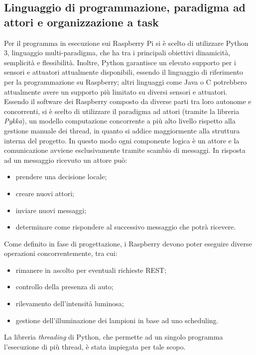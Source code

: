 \subsection{Linguaggio di programmazione, paradigma ad attori e organizzazione a task}
Per il programma in esecuzione sui Raspberry Pi si è scelto di utilizzare Python 3, linguaggio multi-paradigma, che ha tra i principali obiettivi dinamicità, semplicità e flessibilità.
Inoltre, Python garantisce un elevato supporto per i sensori e attuatori attualmente disponibili, essendo il linguaggio di riferimento per la programmazione su Raspberry; altri linguaggi come Java o C potrebbero attualmente avere un supporto più limitato su diversi sensori e attuatori.
\\Essendo il software dei Raspberry composto da diverse parti tra loro autonome e concorrenti, si è scelto di utilizzare il paradigma ad attori (tramite la libreria \textit{Pykka}), un modello computazione concorrente a più alto livello rispetto alla gestione manuale dei thread, in quanto si addice maggiormente alla struttura interna del progetto.
In questo modo ogni componente logica è un attore e la comunicazione avviene esclusivamente tramite scambio di messaggi. In risposta ad un messaggio ricevuto un attore può:
\begin{itemize}
 \item prendere una decisione locale;
 \item creare nuovi attori;
 \item inviare nuovi messaggi;
 \item determinare come rispondere al successivo messaggio che potrà ricevere.
\end{itemize}
Come definito in fase di progettazione, i Raspberry devono poter eseguire diverse operazioni concorrentemente, tra cui:
\begin{itemize}
 \item rimanere in ascolto per eventuali richieste REST;
 \item controllo della presenza di auto;
 \item rilevamento dell'intensità luminosa;
 \item gestione dell'illuminazione dei lampioni in base ad uno scheduling.
\end{itemize}
La libreria \textit{threading} di Python, che permette ad un singolo programma l'esecuzione di più thread, è stata impiegata per tale scopo.

